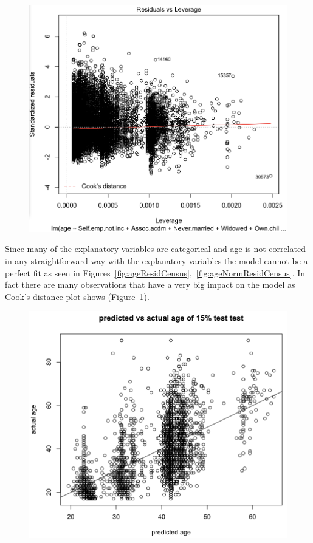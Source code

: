 \documentclass[letter]{article}
\begin{document}
\begin{figure}
 \includegraphics[scale=0.5]{figures/cookResidCensus.png}
 \caption{}
  \label{fig:cookResidCensus}
\end{figure}

Since many of the explanatory variables are categorical and age is not correlated in any straightforward way with the explanatory variables the model cannot be a perfect fit as seen in Figures~\ref{fig:ageResidCensus},~\ref{fig:ageNormResidCensus}. In fact there are many observations that have a very big impact on the model as Cook's distance plot shows (Figure~\ref{fig:cookResidCensus}).

\begin{figure}
\includegraphics[scale=0.5]{figures/predVsActualCensus.png}
\caption{}
 \label{fig:predVsActualCensus}
\end{figure}
\end{document}
